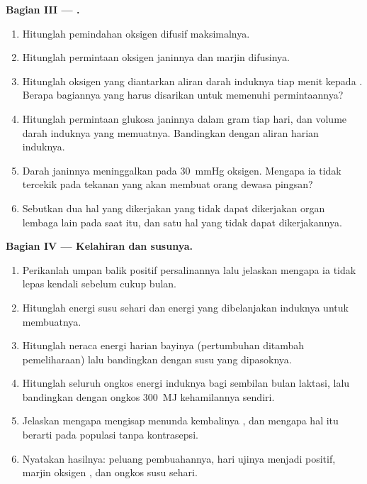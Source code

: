 \begin{problem}
\medskip
\noindent\textbf{Bagian III --- .}
\begin{enumerate}[resume]
  \item Hitunglah pemindahan oksigen difusif maksimalnya.
  \item Hitunglah permintaan oksigen janinnya dan marjin difusinya.
  \item Hitunglah oksigen yang diantarkan aliran darah induknya tiap
        menit kepada . Berapa bagiannya yang harus disarikan
        untuk memenuhi permintaannya?
  \item Hitunglah permintaan glukosa janinnya dalam gram tiap hari, dan
        volume darah induknya yang memuatnya. Bandingkan dengan aliran
         harian induknya.
  \item Darah janinnya meninggalkan  pada \qty{30}{mmHg}
        oksigen. Mengapa ia tidak tercekik pada tekanan yang akan
        membuat orang dewasa pingsan?
  \item Sebutkan dua hal yang dikerjakan  yang tidak dapat
        dikerjakan organ lembaga lain pada saat itu, dan satu hal yang
        tidak dapat dikerjakannya.
\end{enumerate}

\medskip
\noindent\textbf{Bagian IV --- Kelahiran dan susunya.}
\begin{enumerate}[resume]
  \item Perikanlah umpan balik positif persalinannya lalu jelaskan
        mengapa ia tidak lepas kendali sebelum cukup bulan.
  \item Hitunglah energi susu sehari dan energi yang dibelanjakan
        induknya untuk membuatnya.
  \item Hitunglah neraca energi harian bayinya (pertumbuhan ditambah
        pemeliharaan) lalu bandingkan dengan susu yang dipasoknya.
  \item Hitunglah seluruh ongkos energi induknya bagi sembilan bulan
        laktasi, lalu bandingkan dengan ongkos \qty{300}{MJ} kehamilannya
        sendiri.
  \item Jelaskan mengapa mengisap menunda kembalinya , dan
        mengapa hal itu berarti pada populasi tanpa kontrasepsi.
  \item Nyatakan hasilnya: peluang pembuahannya, hari ujinya menjadi
        positif, marjin oksigen , dan ongkos susu sehari.
\end{enumerate}
\end{problem}
